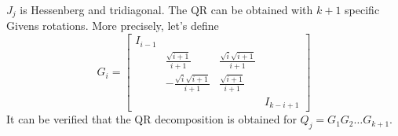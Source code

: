 \documentclass[]{article}
\newcommand{\BIN}{\begin{bmatrix}}
\newcommand{\BOUT}{\end{bmatrix}}
\begin{document}
$J_j$ is Hessenberg and tridiagonal. The QR can be obtained with $k+1$ specific Givens rotations. More precisely, let's define
\begin{equation}
G_i = \BIN
  I_{i-1} & & & \\
    & \frac{\sqrt{i+1}}{i+1} & \frac{\sqrt{i}\sqrt{i+1}}{i+1} & \\
    & -\frac{\sqrt{i}\sqrt{i+1}}{i+1} & \frac{\sqrt{i+1}}{i+1} & \\
    & & & I_{k-i+1}
\BOUT
\end{equation}
It can be verified that the QR decomposition is obtained for $Q_j = G_1 G_2 \ldots G_{k+1}$.
\end{document}
